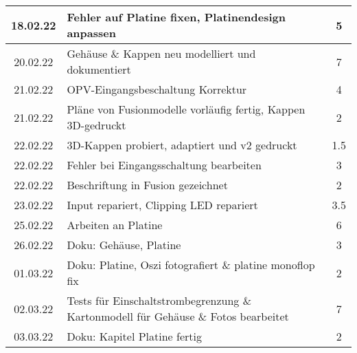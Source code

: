 \begin{longtable}{c|p{10cm}|c}
    18.02.22       & Fehler auf Platine fixen, Platinendesign anpassen                                                             & 5                \\ \hline
    20.02.22       & Gehäuse \& Kappen neu modelliert und dokumentiert                                                             & 7                \\ \hline
    21.02.22       & OPV-Eingangsbeschaltung Korrektur                                                                             & 4                \\ \hline
    21.02.22       & Pläne von Fusionmodelle vorläufig fertig, \newline Kappen 3D-gedruckt                                         & 2                \\ \hline
    22.02.22       & 3D-Kappen probiert, adaptiert und v2 gedruckt                                                                 & 1.5              \\ \hline
    22.02.22       & Fehler bei Eingangsschaltung bearbeiten                                                                       & 3                \\ \hline
    22.02.22       & Beschriftung in Fusion gezeichnet                                                                             & 2                \\ \hline
    23.02.22       & Input repariert, Clipping LED repariert                                                                       & 3.5              \\ \hline
    25.02.22       & Arbeiten an Platine                                                                                           & 6                \\ \hline
    26.02.22       & Doku: Gehäuse, Platine                                                                                        & 3                \\ \hline
    01.03.22       & Doku: Platine, Oszi fotografiert \& platine monoflop fix                                                      & 2                \\ \hline
    02.03.22       & Tests für Einschaltstrombegrenzung \& Kartonmodell \newline für Gehäuse \& Fotos bearbeitet                   & 7                \\ \hline
    03.03.22       & Doku: Kapitel Platine fertig                                                                                  & 2                \\ \hline

\end{longtable}
